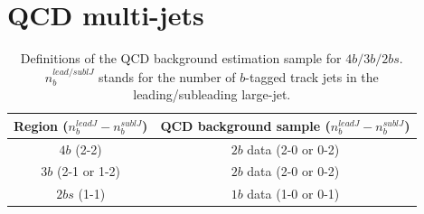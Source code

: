 \section{QCD multi-jets}
\label{sec:boosted-qcd}

\begin{table}[htbp!]
\begin{center}
\caption{Definitions of the QCD background estimation sample for $4b/3b/2bs$. $n^{lead/sublJ}_{b}$ stands for the number of $b$-tagged track jets in the leading/subleading large-\R jet.}
\begin{tabular}{c|c}
\hline
  Region ($n^{leadJ}_{b} - n^{sublJ}_{b}$)  & QCD background sample ($n^{leadJ}_{b} - n^{sublJ}_{b}$) \\
  \hline
  $4b$ (2-2) & $2b$ data (2-0 or 0-2) \\
  $3b$ (2-1 or 1-2)& $2b$ data (2-0 or 0-2) \\
  $2bs$ (1-1) & $1b$ data (1-0 or 0-1) \\
  \end{tabular}
\label{tab:boosted-qcd-bkgsample}
\end{center}
\end{table}

